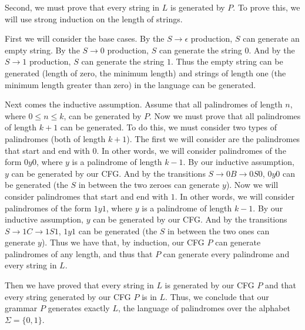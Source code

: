\documentclass{article}
\begin{document}
\begin{description}
        Second, we must prove that every string in $L$ is generated by $P$.
        To prove this, we will use strong induction on the length of strings.

        First we will consider the base cases. By the $S \rightarrow \epsilon$
        production, $S$ can generate an empty string. By the
        $S \rightarrow 0$ production, $S$ can generate the string $0$. And
        by the $S \rightarrow 1$ production, $S$ can generate the string $1$.
        Thus the empty string can be generated (length of zero, the minimum
        length) and strings of length one (the minimum length greater than
        zero) in the language can be generated.

        Next comes the inductive assumption. Assume that all palindromes of
        length $n$, where $0 \leq n \leq k$, can be generated by $P$. Now
        we must prove that all palindromes of length $k + 1$ can be generated.
        To do this, we must consider two types of palindromes (both of length
        $k + 1$). The first we will consider are the palindromes that start
        and end with $0$. In other words, we will consider palindromes of
        the form $0y0$, where $y$ is a palindrome of length $k - 1$. By our
        inductive assumption, $y$ can be generated by our CFG. And by
        the transitions $S \rightarrow 0B \rightarrow 0S0$, $0y0$ can be
        generated (the $S$ in between the two zeroes can generate $y$).
        Now we will consider palindromes that start and end with $1$. In
        other words, we will consider palindromes of the form $1y1$, where
        $y$ is a palindrome of length $k - 1$. By our inductive assumption,
        $y$ can be generated by our CFG. And by the transitions
        $S \rightarrow 1C \rightarrow 1S1$, $1y1$ can be generated (the $S$
        in between the two ones can generate $y$). Thus we have that,
        by induction, our CFG $P$ can generate palindromes of any length,
        and thus that $P$ can generate every palindrome and every string in $L$.

        Then we have proved that every string in $L$ is generated by our CFG
        $P$ and that every string generated by our CFG $P$ is in $L$. Thus,
        we conclude that our grammar $P$ generates exactly $L$, the language
        of palindromes over the alphabet $\Sigma = \{0,1\}$.
\end{description}
\newpage

\end{document}
